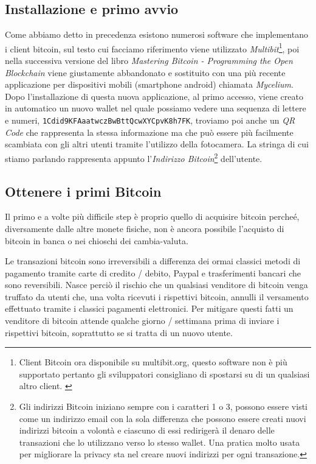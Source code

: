 \subsection*{Installazione e primo avvio}
Come abbiamo detto in precedenza esistono numerosi software che implementano i client bitcoin, sul testo cui facciamo riferimento \cite{mastering:andreas} viene utilizzato \textit{Multibit}\footnote{Client Bitcoin ora disponibile su multibit.org, questo software non è più supportato pertanto gli sviluppatori consigliano di spostarsi su di un qualsiasi altro client. \cite{multibit-software}}, poi nella successiva versione del libro \textit{Mastering Bitcoin - Programming the Open Blockchain}\cite{mastering2:andreas} viene giustamente abbandonato e sostituito con una più recente applicazione per dispositivi mobili (smartphone android) chiamata \textit{Mycelium}. Dopo l'installazione di questa nuova applicazione, al primo accesso, viene creato in automatico un nuovo wallet nel quale possiamo vedere una sequenza di lettere e numeri, \texttt{1Cdid9KFAaatwczBwBttQcwXYCpvK8h7FK}, troviamo poi anche un \textit{QR Code} che rappresenta la stessa informazione ma che può essere più facilmente scambiata con gli altri utenti tramite l'utilizzo della fotocamera. La stringa di cui stiamo parlando rappresenta appunto l'\textit{Indirizzo Bitcoin}\footnote{Gli indirizzi Bitcoin iniziano sempre con i caratteri 1 o 3, possono essere visti come un indirizzo email con la sola differenza che possono essere creati nuovi indirizzi bitcoin a volontà e ciascuno di essi redirigerà il denaro delle transazioni che lo utilizzano verso lo stesso wallet. Una pratica molto usata per migliorare la privacy sta nel creare nuovi indirizzi per ogni transazione.} dell'utente.

\subsection*{Ottenere i primi Bitcoin}
Il primo e a volte più difficile step è proprio quello di acquisire bitcoin percheé, diversamente dalle altre monete fisiche, non è ancora possibile l'acquisto di bitcoin in banca o nei chioschi dei cambia-valuta. 

Le transazioni bitcoin sono irreversibili a differenza dei ormai classici metodi di pagamento tramite carte di credito / debito, Paypal e trasferimenti bancari che sono reversibili. Nasce perciò il rischio che un qualsiasi venditore di bitcoin venga truffato da utenti che, una volta ricevuti i rispettivi bitcoin, annulli il versamento effettuato tramite i classici pagamenti elettronici. Per mitigare questi fatti un venditore di bitcoin attende qualche giorno / settimana prima di inviare i rispettivi bitcoin, soprattutto se si tratta di un nuovo utente. 

